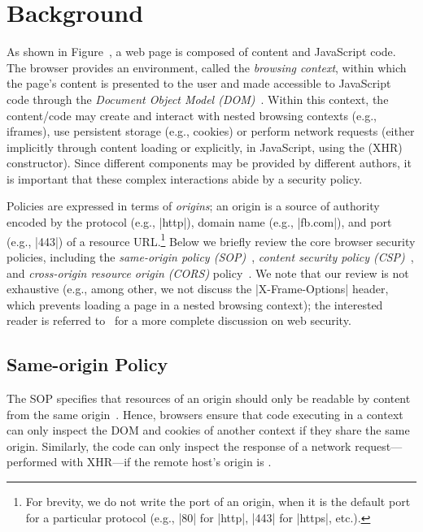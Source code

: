 \section{Background}
\label{sec:background}

%
As shown in Figure~, a web page is composed of
content and JavaScript code.
%
The browser provides an environment, called the \emph{browsing
context}, within which the page's content is presented to the user and
made accessible to JavaScript code through the \emph{Document Object
Model (DOM)}~\cite{html5}.
%
Within this context, the content/code may create and interact with
nested browsing contexts (e.g., iframes), use persistent storage
(e.g., cookies) or perform network requests (either implicitly through
content loading or explicitly, in JavaScript, using the \xhr{} (XHR)
constructor).
%
Since different components may be provided by different authors, it is
important that these complex interactions abide by a security policy.
 
Policies are expressed in terms of \emph{origins}; an origin is a
source of authority encoded by the protocol (e.g., \js|http|), domain
name (e.g., \js|fb.com|), and port (e.g., \js|443|) of a resource
URL.\footnote{
  For brevity, we do not write the port of an origin, when it is the
  default port for a particular protocol (e.g., \js|80| for \js|http|,
  \js|443| for \js|https|, etc.).
}
%
Below we briefly review the core browser security policies, including
the \emph{same-origin policy (SOP)}~\cite{rfc6454}, \emph{content security
policy (CSP)}~\cite{csp}, and \emph{cross-origin resource origin
(CORS)} policy~\cite{cors13}.
%
%
We note that our review is not exhaustive (e.g., among other, we not
discuss the \js|X-Frame-Options| header, which prevents loading a page
in a nested browsing context);  the interested reader is referred
to~\cite{googlehandbook} for a more complete discussion on web security.



\subsection{Same-origin Policy}
\label{sec:background:sop}

The SOP specifies that resources of an origin should only be readable
by content from the same origin~\cite{rfc6454, googlehandbook,
VanKesteren2012}.
%
Hence, browsers ensure that code executing in a  context
can only inspect the DOM and cookies of another context if they share
the same origin.
%
Similarly, the code can only inspect the response of a network
request---performed with XHR---if the remote host's origin is
.
%
 
